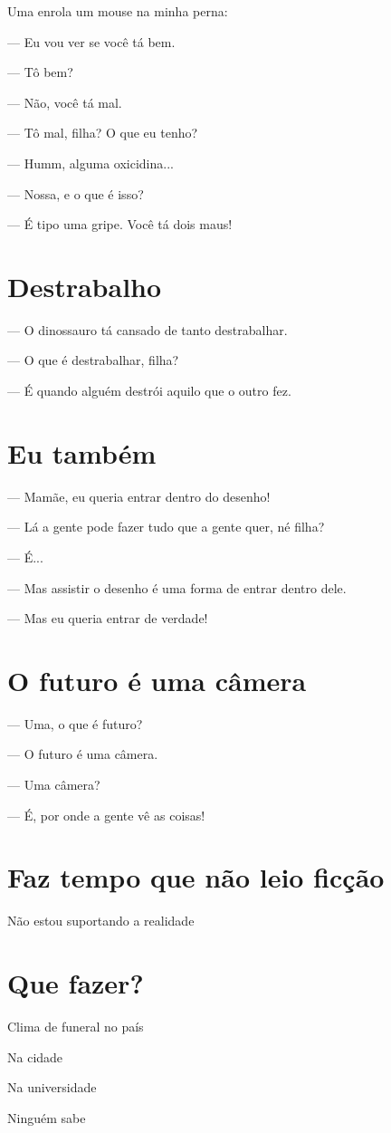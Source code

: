 {Uma enrola um mouse na minha perna:

— Eu vou ver se você tá bem.

— Tô bem?

— Não, você tá mal.

— Tô mal, filha? O que eu tenho?

— Humm, alguma oxicidina...

— Nossa, e o que é isso?

— É tipo uma gripe. Você tá dois maus!

\chapter{Destrabalho}

— O dinossauro tá cansado de tanto destrabalhar.

— O que é destrabalhar, filha?

— É quando alguém destrói aquilo que o outro fez.

\chapter{Eu também}

— Mamãe, eu queria entrar dentro do desenho!

— Lá a gente pode fazer tudo que a gente quer, né filha?

— É...

— Mas assistir o desenho é uma forma de entrar dentro dele.

— Mas eu queria entrar de verdade!

\chapter{O futuro é uma câmera}

— Uma, o que é futuro?

— O futuro é uma câmera.

— Uma câmera?

— É, por onde a gente vê as coisas!

\chapter{Faz tempo que não leio ficção}

Não estou suportando a realidade

\chapter{Que fazer?}

Clima de funeral no país

Na cidade

Na universidade

Ninguém sabe
}
